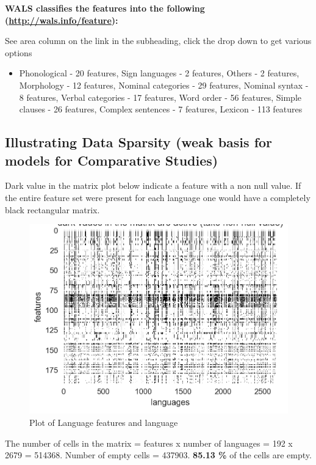 \textbf{WALS classifies the features into the following (\url{http://wals.info/feature}):}

See area column on the link in the subheading, click the drop down to get various options

\begin{itemize}
\item Phonological - 20 features, Sign languages - 2 features, Others - 2 features, Morphology - 12 features, Nominal categories - 29 features, Nominal syntax - 8 features, Verbal categories - 17 features, Word order - 56 features, Simple clauses - 26 features, Complex sentences - 7 features, Lexicon - 113 features

\end{itemize}


\subsection*{Illustrating Data Sparsity (weak basis for models for Comparative Studies)}

Dark value in the matrix plot below indicate a feature with a non null value. If the entire feature set were present for each language one would have a completely black rectangular matrix.

\begin{figure}[!hbp]
\includegraphics[scale=0.29]{images/6-02.jpg}
\caption{Plot of Language features and language}\label{art6-fig02}
\end{figure}

The number of cells in the matrix = features x number of languages = 192 x 2679 = 514368. Number of empty cells = 437903. \textbf{85.13 \%} of the cells are empty.


